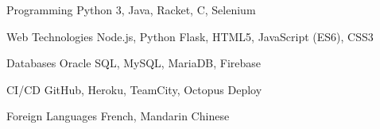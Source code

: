 

\begin{cvskills}

  \cvskill
  {Programming} %
  {Python 3, Java, Racket, C, Selenium} %

  \cvskill
  {Web Technologies} %
  {Node.js, Python Flask, HTML5, JavaScript (ES6), CSS3} %

  \cvskill
  {Databases} %
  {Oracle SQL, MySQL, MariaDB, Firebase} %


  \cvskill
  {CI/CD} %
  {GitHub, Heroku, TeamCity, Octopus Deploy} %

  \cvskill
  {Foreign Languages} %
  {French, Mandarin Chinese} %

\end{cvskills}
